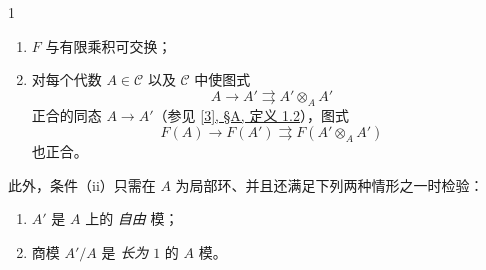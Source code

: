 \begin{theorem}{1}
\begin{enumerate}
 \item[i.]\(F\) 与有限乘积可交换；

      
 \item[ii.]对每个代数 \(A\in \mathcal {C}\) 以及 \(\mathcal {C}\) 中使图式 \[           A \to  A' \rightrightarrows  A'\otimes _A A'         \] 正合的同态 \(A\to  A'\)（参见 \hyperref[fga3.i-a.1-definition-1.2]{[3], §A, 定义 1.2}），图式 \[           F(A) \to  F(A') \rightrightarrows  F(A'\otimes _A A')         \] 也正合。

    \end{enumerate} 此外，条件（ii）只需在 \(A\) 为局部环、并且还满足下列两种情形之一时检验：\begin{enumerate}
      
 \item[a.]\(A'\) 是 \(A\) 上的 \emph{自由} 模；

      
 \item[b.]商模 \(A'/A\) 是 \emph{长为 \(1\)} 的 \(A\) 模。


\end{enumerate}
\end{theorem}
